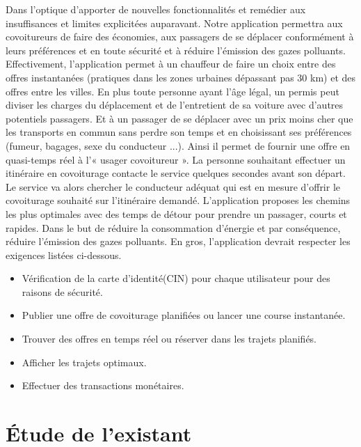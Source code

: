 Dans l'optique d'apporter de nouvelles fonctionnalités et remédier aux insuffisances et limites explicitées auparavant. Notre application permettra aux covoitureurs de faire des économies, aux passagers de se déplacer conformément à leurs préférences et en toute sécurité et à réduire l’émission des gazes polluants.\newline
Effectivement, l'application permet à un chauffeur de faire un choix entre des offres instantanées (pratiques dans les zones urbaines dépassant pas 30 km) et des offres entre les villes. En plus toute personne ayant l'âge légal, un permis peut diviser les charges du déplacement et de l'entretient de sa voiture avec d'autres potentiels passagers. Et à un passager de se déplacer avec un prix moins cher que les transports en commun sans perdre son temps et en choisissant ses préférences (fumeur, bagages, sexe du conducteur ...). Ainsi il permet de fournir une offre en quasi-temps réel à l'« usager covoitureur ». La personne souhaitant effectuer un itinéraire en covoiturage contacte le service quelques secondes avant son départ. Le service va alors chercher le conducteur adéquat qui est en mesure d'offrir le covoiturage souhaité sur l'itinéraire demandé.\newline
L'application proposes les chemins les plus optimales avec des temps de détour pour prendre un passager, courts et rapides. Dans le but de réduire la consommation d’énergie et par conséquence, réduire l’émission des gazes polluants.
En gros, l'application devrait respecter les exigences listées ci-dessous.
\begin{itemize}
	\item Vérification de la carte d'identité(CIN) pour chaque utilisateur pour des raisons de sécurité.
	\item Publier une offre de covoiturage planifiées ou lancer une course instantanée.
	\item Trouver des offres en temps réel ou réserver dans les trajets planifiés.
	\item Afficher les trajets optimaux.
	\item Effectuer des transactions monétaires.
\end{itemize}

\section{Étude de l'existant}

